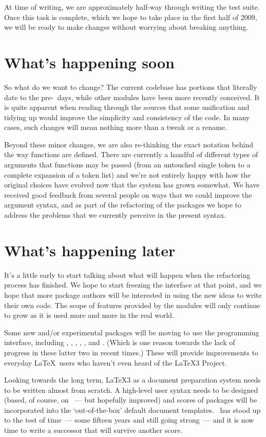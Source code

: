 \documentclass{ltnews}
\begin{document}
At time of writing, we are approximately half-way through writing the test
suite. Once this task is complete, which we hope to take place in the first
half of 2009, we will be ready to make changes without worrying about breaking
anything.

\section{What's happening soon}

So what do we want to change? The current  codebase has
portions that literally date to the pre-\LaTeXe\ days, while other modules
have been more recently conceived. It is quite apparent when reading through
the sources that some unification and tidying up would improve the simplicity
and consistency of the code. In many cases, such changes will mean nothing
more than a tweak or a rename.

Beyond these minor changes, we are also re-thinking the exact notation behind
the way functions are defined. There are currently a handful of different
types of arguments that functions may be passed (from an untouched single
token to a complete expansion of a token list) and we're not entirely happy
with how the original choices have evolved now that the system has grown
somewhat. We have received good feedback from several people on ways that we
could improve the argument syntax, and as part of the refactoring of the
 packages we hope to address the problems that we currently
perceive in the present syntax.

\section{What's happening later}

It's a little early to start talking about what will happen when the
refactoring process has finished. We hope to start freezing the interface at
that point, and we hope that more package authors will be interested in using
the new ideas to write their own code. The scope of features provided by the
 modules will only continue to grow as it is used more and more
in the real world.

Some new and/or experimental packages will be moving to use the
 programming interface, including ,
, , , ,
and . (Which is one reason towards the lack of progress
in these latter two in recent times.) These will provide improvements to
everyday \LaTeX\ users who haven't even heard of the \LaTeX3 Project.

Looking towards the long term, \LaTeX3 as a document preparation system needs
to be written almost from scratch. A high-level user syntax needs to be
designed (based, of course, on \LaTeXe~--- but hopefully improved) and scores
of packages will be incorporated into the `out-of-the-box' default document
templates. \LaTeXe\ has stood up to the test of time~--- some fifteen years
and still going strong~--- and it is now time to write a successor that will
survive another score.
\end{document}
